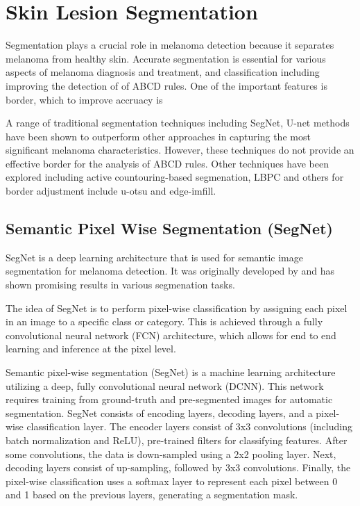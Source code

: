 \section{Skin Lesion Segmentation}
Segmentation plays a crucial role in melanoma detection because it separates melanoma from healthy skin. Accurate segmentation is essential for various aspects of melanoma diagnosis and treatment, and classification\cite{Albahli2020} including improving the detection of of ABCD rules\cite{Lee2020}. One of the important features is border, which to improve accruacy is

A range of traditional segmentation techniques including SegNet, U-net methods have been shown to outperform other approaches in capturing the most significant melanoma characteristics. However, these techniques do not provide an effective border for the analysis of ABCD rules. Other techniques have been explored including active countouring-based segmenation\cite{Riaz2019}, LBPC and others for border adjustment include u-otsu and edge-imfill.


\subsection{Semantic Pixel Wise Segmentation (SegNet)}
SegNet is a deep learning architecture that is used for semantic image segmentation for melanoma detection. It was originally developed by\cite{chen2018} and has shown promising results in various segmenation tasks.

The idea of SegNet is to perform pixel-wise classification by assigning each pixel in an image to a specific class or category. This is achieved through a fully convolutional neural network (FCN) architecture, which allows for end to end learning and inference at the pixel level. 

Semantic pixel-wise segmentation (SegNet) is a machine learning architecture utilizing a deep, fully convolutional neural network (DCNN). This network requires training from ground-truth and pre-segmented images for automatic segmentation. SegNet consists of encoding layers, decoding layers, and a pixel-wise classification layer. The encoder layers consist of 3x3 convolutions (including batch normalization and ReLU), pre-trained filters for classifying features. After some convolutions, the data is down-sampled using a 2x2 pooling layer. Next, decoding layers consist of up-sampling, followed by 3x3 convolutions. Finally, the pixel-wise classification uses a softmax layer to represent each pixel between 0 and 1 based on the previous layers, generating a segmentation mask.

